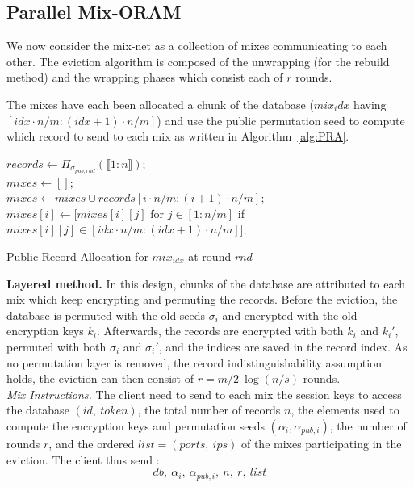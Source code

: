 \documentclass[USenglish,oneside,twocolumn]{article}
\begin{document}
\subsection{Parallel Mix-ORAM}\label{parallelMixORAM}
%
We now consider the mix-net as a collection of mixes communicating to each other. The eviction algorithm is composed of the unwrapping (for the rebuild method) and the wrapping phases which consist each of $r$ rounds.

The mixes have each been allocated a chunk of the database ($mix_idx$ having $[idx\cdot n/m : (idx+1)\cdot n/m]$) and use the public permutation seed to compute which record to send to each mix as written in Algorithm~\ref{alg:PRA}.


\begin{algorithm}
\DontPrintSemicolon
{}
$records \gets {\Pi}_{\sigma_{pub, rnd}}(\llbracket 1 : n \rrbracket)$;\\
$mixes \gets []$;\\
{
	$mixes \gets mixes \cup records[i\cdot n/m : (i+1)\cdot n/m]$;\\
	$mixes[i]\gets [mixes[i][j]$ for $j \in [1:n/m]$ if $mixes[i][j] \in [idx\cdot n/m : (idx+1)\cdot n/m] ]$;\\
}
\caption{Public Record Allocation for $mix_{idx}$ at round $rnd$}
\label{alg:PRA}
\end{algorithm}

\noindent\textbf{Layered method.} In this design, chunks of the database are attributed to each mix which keep encrypting and permuting the records. Before the eviction, the database is permuted with the old seeds $\sigma_i$ and encrypted with the old encryption keys $k_i$. Afterwards, the records are encrypted with both $k_i$ and $k_i'$, permuted with both $\sigma_i$ and $\sigma_i'$, and the indices are saved in the record index. 
As no permutation layer is removed, the record indistinguishability assumption holds, the eviction can then consist of $r= m/2 \ \log(n/s)$ rounds. \\

\noindent\textit{Mix Instructions.}
The client need to send to each mix the session keys to access the database $(id,\ token)$, the total number of records $n$, the elements used to compute the encryption keys and permutation seeds $(\alpha_i, \alpha_{pub, i})$, the number of rounds $r$, and the ordered $list=(ports,\ ips)$ of the mixes participating in the eviction. The client thus send :
$$db,\ \alpha_i,\ \alpha_{pub, i},\ n,\ r,\ list$$
\end{document}
